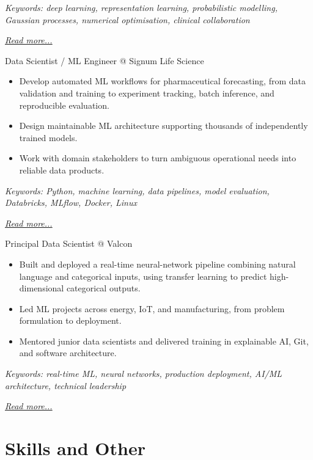 \documentclass[11pt,a4paper]{moderncv}
\begin{document}
{\footnotesize\textit{Keywords: deep learning, representation learning, probabilistic modelling, Gaussian processes, numerical optimisation, clinical collaboration}}

\hfill{\small{\textit{\hyperref[sec:raysearch]{Read more...}}}}

\large{Data Scientist / ML Engineer @ Signum Life Science}
\normalsize
\begin{itemize}
    \item Develop automated ML workflows for pharmaceutical forecasting, from data validation and training to experiment tracking, batch inference, and reproducible evaluation.
    \item Design maintainable ML architecture supporting thousands of independently trained models.
    \item Work with domain stakeholders to turn ambiguous operational needs into reliable data products.
\end{itemize}

{\footnotesize\textit{Keywords: Python, machine learning, data pipelines, model evaluation, Databricks, MLflow, Docker, Linux}}

\hfill{\small{\textit{\hyperref[sec:signum]{Read more...}}}}

\large{Principal Data Scientist @ Valcon}
\normalsize
\begin{itemize}
    \item Built and deployed a real-time neural-network pipeline combining natural language and categorical inputs, using transfer learning to predict high-dimensional categorical outputs.
    \item Led ML projects across energy, IoT, and manufacturing, from problem formulation to deployment.
    \item Mentored junior data scientists and delivered training in explainable AI, Git, and software architecture.
\end{itemize}

{\footnotesize\textit{Keywords: real-time ML, neural networks, production deployment, AI/ML architecture, technical leadership}}

\hfill{\small{\textit{\hyperref[sec:valcon]{Read more...}}}}


\section{Skills and Other}
\end{document}
